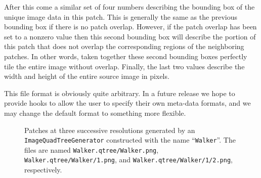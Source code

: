 After this come a similar set of four numbers describing the bounding
box of the unique image data in this patch.  This is generally the
same as the previous bounding box if there is no patch overlap.
However, if the patch overlap has been set to a nonzero value then
this second bounding box will describe the portion of this patch that
does not overlap the corresponding regions of the neighboring patches.
In other words, taken together these second bounding boxes perfectly
tile the entire image without overlap.  Finally, the last two values
describe the width and height of the entire source image in pixels.

This file format is obviously quite arbitrary.  In a future release 
we hope to provide hooks to allow the user to specify their own 
meta-data formats, and we may change the default format to something 
more flexible.

\begin{figure}[t]
\centering
  \hfil
  \hfil
\caption{Patches at three successive resolutions generated by an {\tt ImageQuadTreeGenerator} 
constructed with the name ``{\tt Walker}''.  The files are named {\tt Walker.qtree/Walker.png}, 
{\tt Walker.qtree/Walker/1.png}, and {\tt Walker.qtree/Walker/1/2.png}, respectively.}
\label{fig:blend}
\end{figure}

